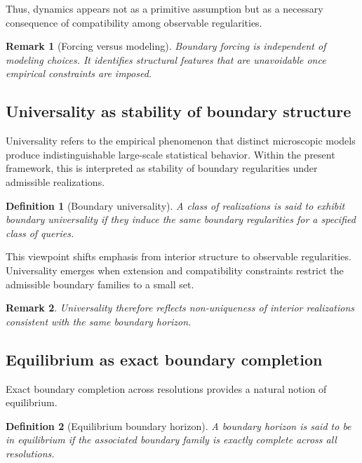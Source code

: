 \documentclass[11pt]{article}
\newtheorem{definition}{Definition}
\newtheorem{remark}{Remark}
\begin{document}
Thus, dynamics appears not as a primitive assumption but as a necessary
consequence of compatibility among observable regularities.

\begin{remark}[Forcing versus modeling]
Boundary forcing is independent of modeling choices.
It identifies structural features that are unavoidable once empirical
constraints are imposed.
\end{remark}

\subsection{Universality as stability of boundary structure}

Universality refers to the empirical phenomenon that distinct microscopic
models produce indistinguishable large-scale statistical behavior.
Within the present framework, this is interpreted as stability of boundary
regularities under admissible realizations.

\begin{definition}[Boundary universality]
A class of realizations is said to exhibit \emph{boundary universality} if
they induce the same boundary regularities for a specified class of queries.
\end{definition}

This viewpoint shifts emphasis from interior structure to observable
regularities.  Universality emerges when extension and compatibility
constraints restrict the admissible boundary families to a small set.

\begin{remark}
Universality therefore reflects non-uniqueness of interior realizations
consistent with the same boundary horizon.
\end{remark}

\subsection{Equilibrium as exact boundary completion}

Exact boundary completion across resolutions provides a natural notion of
equilibrium.

\begin{definition}[Equilibrium boundary horizon]
A boundary horizon is said to be in \emph{equilibrium} if the associated
boundary family is exactly complete across all resolutions.
\end{definition}
\end{document}
